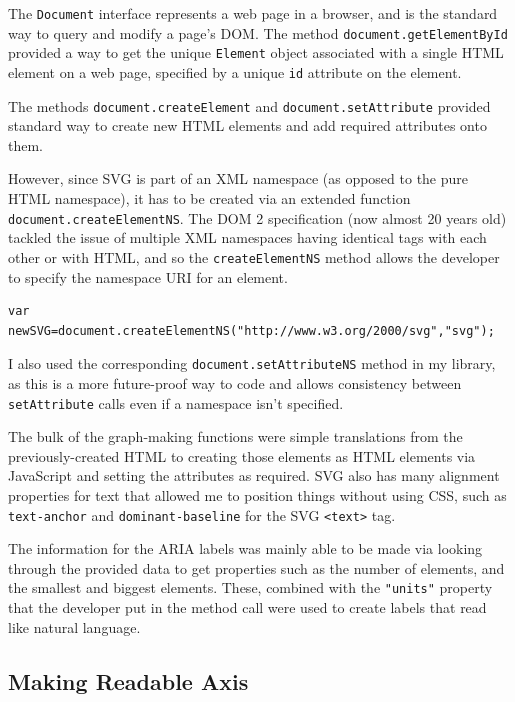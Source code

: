 \documentclass[ %
                    author={Aleena Baig},
                supervisor={Dr Simon Lock},
                    degree={BSc},
                     title={On Making Web Accessible Graphs},
                  subtitle={},
                      year={2019} ]{dissertation}
\begin{document}
The \texttt{Document} interface represents a web page in a browser, and is the standard way to query and modify a page's DOM. The method \texttt{document.getElementById} provided a way to get the unique \texttt{Element} object associated with a single HTML element on a web page, specified by a unique \texttt{id} attribute on the element.


The methods \texttt{document.createElement} and \texttt{document.setAttribute} provided standard way to create new HTML elements and add required attributes onto them.

However, since SVG is part of an XML namespace (as opposed to the pure HTML namespace), it has to be created via an extended function \texttt{document.createElementNS}. The DOM 2 specification (now almost 20 years old) tackled the issue of multiple XML namespaces having identical tags with each other or with HTML, and so the \texttt{createElementNS} method allows the developer to specify the namespace URI for an element.

\begin{lstlisting}
var newSVG=document.createElementNS("http://www.w3.org/2000/svg","svg");
\end{lstlisting}

I also used the corresponding \texttt{document.setAttributeNS} method in my library, as this is a more future-proof way to code and allows consistency between \texttt{setAttribute} calls even if a namespace isn't specified.

The bulk of the graph-making functions were simple translations from the previously-created HTML to creating those elements as HTML elements via JavaScript and setting the attributes as required. SVG also has many alignment properties for text that allowed me to position things without using CSS, such as \texttt{text-anchor} and \texttt{dominant-baseline} for the SVG \texttt{<text>} tag.

The information for the ARIA labels was mainly able to be made via looking through the provided data to get properties such as the number of elements, and the smallest and biggest elements. These, combined with the \texttt{"units"} property that the developer put in the method call were used to create labels that read like natural language.


\subsection{Making Readable Axis}
\end{document}
